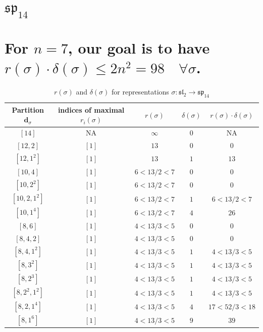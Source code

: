 \documentclass{article}%
\begin{document}
%
\section{$\mathfrak{sp}_{14}$}%
\section*{For $n=7$, our goal is to have $r(\sigma) \cdot \delta(\sigma) \leq 2n^2 = 98 \quad \forall \sigma$.}%

%
\linebreak%

    \begin{center}
    \label{table:sp_14}
    \begin{longtable}{||c|c|c|c|c||}
    \caption{$r(\sigma)$ and $\delta(\sigma)$ for representations $\sigma: \mathfrak{sl}_2 \to \mathfrak{sp}_{14}$}
    \hline
    Partition $\textbf{d}_\sigma$
    &indices of maximal $r_i(\sigma)$
    &$r(\sigma)$
    &$\delta(\sigma)$
    &$r(\sigma) \cdot \delta(\sigma)$
    \\ [0.3ex] \hline\endhead
    $[14]$ & NA & $\infty$ & $0$ & NA \\ \hline 
$[12, 2]$ & $[1]$ & $13$ & $0$ & $0$ \\ \hline 
$[12, 1^{2}]$ & $[1]$ & $13$ & $1$ & $13$ \\ \hline 
$[10, 4]$ & $[1]$ & $6 < 13/2 < 7$ & $0$ & $0$ \\ \hline 
$[10, 2^{2}]$ & $[1]$ & $6 < 13/2 < 7$ & $0$ & $0$ \\ \hline 
$[10, 2, 1^{2}]$ & $[1]$ & $6 < 13/2 < 7$ & $1$ & $6 < 13/2 < 7$ \\ \hline 
$[10, 1^{4}]$ & $[1]$ & $6 < 13/2 < 7$ & $4$ & $26$ \\ \hline 
$[8, 6]$ & $[1]$ & $4 < 13/3 < 5$ & $0$ & $0$ \\ \hline 
$[8, 4, 2]$ & $[1]$ & $4 < 13/3 < 5$ & $0$ & $0$ \\ \hline 
$[8, 4, 1^{2}]$ & $[1]$ & $4 < 13/3 < 5$ & $1$ & $4 < 13/3 < 5$ \\ \hline 
$[8, 3^{2}]$ & $[1]$ & $4 < 13/3 < 5$ & $1$ & $4 < 13/3 < 5$ \\ \hline 
$[8, 2^{3}]$ & $[1]$ & $4 < 13/3 < 5$ & $1$ & $4 < 13/3 < 5$ \\ \hline 
$[8, 2^{2}, 1^{2}]$ & $[1]$ & $4 < 13/3 < 5$ & $1$ & $4 < 13/3 < 5$ \\ \hline 
$[8, 2, 1^{4}]$ & $[1]$ & $4 < 13/3 < 5$ & $4$ & $17 < 52/3 < 18$ \\ \hline 
$[8, 1^{6}]$ & $[1]$ & $4 < 13/3 < 5$ & $9$ & $39$ \\ \hline 

\end{longtable}
\end{center}
\end{document}
